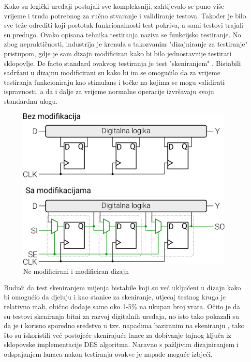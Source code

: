 \documentclass[times, utf8, diplomski]{fer}
\begin{document}
Kako su logički uređaji postajali sve kompleksniji, zahtijevalo se puno više vrijeme i  truda potrebnog za ručno stvaranje i validiranje testova. Također je bilo sve teže odrediti koji postotak funkcionalnosti test pokriva, a sami testovi trajali su predugo. Ovako opisana tehnika testiranja naziva se funkcijsko testiranje. No zbog nepraktičnosti, industrija je krenula s takozvanim "dizajniranje za testiranje"  pristupom, gdje je sam dizajn modificiran kako bi bilo jednostavnije testirati sklopovlje. De facto standard ovakvog testiranja je test "skeniranjem" . Bistabili sadržani u dizajnu modificirani su kako bi im se omogućilo da za vrijeme testiranja funkcioniraju kao stimulans i točke na kojima se mogu validirati ispravnosti, a da i dalje za vrijeme normalne operacije izvršavaju svoju standardnu ulogu.

\begin{figure}[htb]
    \centering
    \includegraphics[width=11cm]{resources/images/SCA/scan-test.png}
    \caption{Ne modificirani i modificiran dizajn}
    \label{fig:scan-test}
\end{figure}

Budući da test skeniranjem mijenja bistabile koji su već uključeni u dizajn kako bi omogućio da djeluju i kao stanice za skeniranje, utjecaj testnog kruga je relativno mali, obično dodaje samo oko 1-5\% na ukupan broj vrata. \citep{semiconductorengineering_2019}
Očito je da su testovi skeniranja bitni za razvoj digitalnih uređaja, no isto tako \cite{yang2004scan} pokazali su da je i korisno sporedno sredstvo u tzv. napadima baziranim na skeniranju , tako što su iskoristili već postojeće skenirajuće lance za dobivanje tajnog ključa iz sklopovske implementacije DES algoritma. Naravno s pažljivim dizajniranjem i odspajanjem lanaca nakon testiranja ovakve je napade moguće izbjeći.
\end{document}
